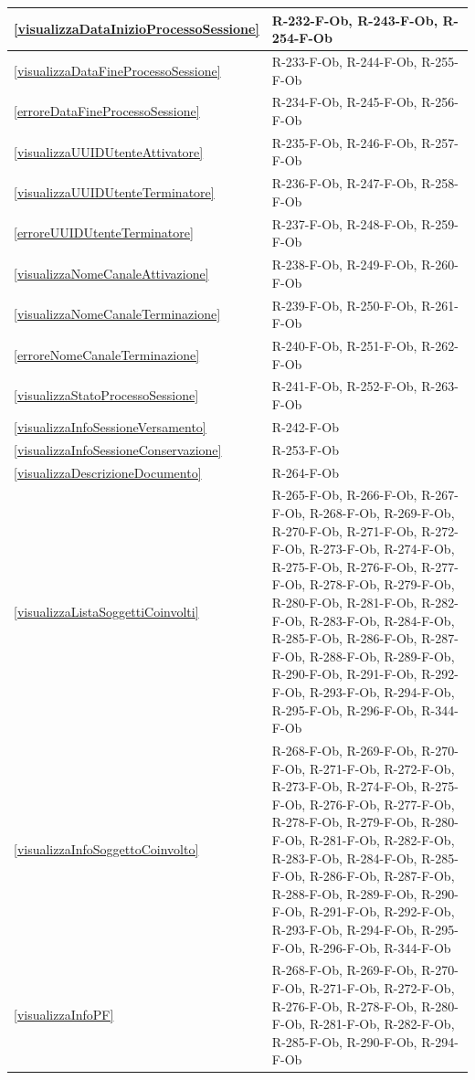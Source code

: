 \begin{longtable}{|p{4cm}|p{10cm}|}
\hline
\ref{visualizzaDataInizioProcessoSessione} & R-232-F-Ob, R-243-F-Ob, R-254-F-Ob \\
\hline
\ref{visualizzaDataFineProcessoSessione} & R-233-F-Ob, R-244-F-Ob, R-255-F-Ob \\
\hline
\ref{erroreDataFineProcessoSessione} & R-234-F-Ob, R-245-F-Ob, R-256-F-Ob \\
\hline
\ref{visualizzaUUIDUtenteAttivatore} & R-235-F-Ob, R-246-F-Ob, R-257-F-Ob \\
\hline
\ref{visualizzaUUIDUtenteTerminatore} & R-236-F-Ob, R-247-F-Ob, R-258-F-Ob \\
\hline
\ref{erroreUUIDUtenteTerminatore} & R-237-F-Ob, R-248-F-Ob, R-259-F-Ob \\
\hline
\ref{visualizzaNomeCanaleAttivazione} & R-238-F-Ob, R-249-F-Ob, R-260-F-Ob \\
\hline
\ref{visualizzaNomeCanaleTerminazione} & R-239-F-Ob, R-250-F-Ob, R-261-F-Ob \\
\hline
\ref{erroreNomeCanaleTerminazione} & R-240-F-Ob, R-251-F-Ob, R-262-F-Ob \\
\hline
\ref{visualizzaStatoProcessoSessione} & R-241-F-Ob, R-252-F-Ob, R-263-F-Ob \\
\hline
\ref{visualizzaInfoSessioneVersamento} & R-242-F-Ob \\
\hline
\ref{visualizzaInfoSessioneConservazione} & R-253-F-Ob \\
\hline
\ref{visualizzaDescrizioneDocumento} & R-264-F-Ob \\
\hline
\ref{visualizzaListaSoggettiCoinvolti} & R-265-F-Ob, R-266-F-Ob, R-267-F-Ob, R-268-F-Ob, R-269-F-Ob, R-270-F-Ob, R-271-F-Ob, R-272-F-Ob, R-273-F-Ob, R-274-F-Ob, R-275-F-Ob, R-276-F-Ob, R-277-F-Ob, R-278-F-Ob, R-279-F-Ob, R-280-F-Ob, R-281-F-Ob, R-282-F-Ob, R-283-F-Ob, R-284-F-Ob, R-285-F-Ob, R-286-F-Ob, R-287-F-Ob, R-288-F-Ob, R-289-F-Ob, R-290-F-Ob, R-291-F-Ob, R-292-F-Ob, R-293-F-Ob, R-294-F-Ob, R-295-F-Ob, R-296-F-Ob, R-344-F-Ob \\
\hline
\ref{visualizzaInfoSoggettoCoinvolto} & R-268-F-Ob, R-269-F-Ob, R-270-F-Ob, R-271-F-Ob, R-272-F-Ob, R-273-F-Ob, R-274-F-Ob, R-275-F-Ob, R-276-F-Ob, R-277-F-Ob, R-278-F-Ob, R-279-F-Ob, R-280-F-Ob, R-281-F-Ob, R-282-F-Ob, R-283-F-Ob, R-284-F-Ob, R-285-F-Ob, R-286-F-Ob, R-287-F-Ob, R-288-F-Ob, R-289-F-Ob, R-290-F-Ob, R-291-F-Ob, R-292-F-Ob, R-293-F-Ob, R-294-F-Ob, R-295-F-Ob, R-296-F-Ob, R-344-F-Ob \\
\hline
\ref{visualizzaInfoPF} & R-268-F-Ob, R-269-F-Ob, R-270-F-Ob, R-271-F-Ob, R-272-F-Ob, R-276-F-Ob, R-278-F-Ob, R-280-F-Ob, R-281-F-Ob, R-282-F-Ob, R-285-F-Ob, R-290-F-Ob, R-294-F-Ob \\

\end{longtable}
